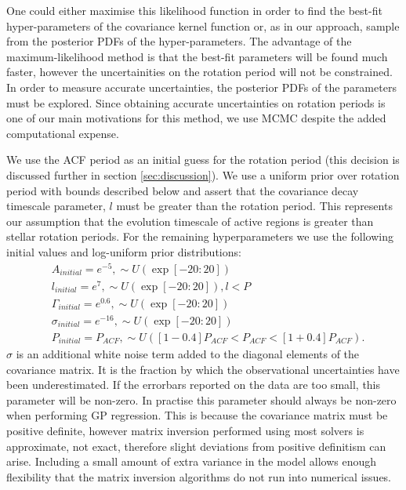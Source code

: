 One could either maximise this likelihood function in order to find the
best-fit hyper-parameters of the covariance kernel function or, as in our
approach, sample from the posterior PDFs of the hyper-parameters.
The advantage of the maximum-likelihood method is that the best-fit parameters
will be found much faster, however the uncertainities on the rotation period
will not be constrained.
In order to measure accurate uncertainties, the posterior PDFs of the
parameters must be explored.
Since obtaining accurate uncertainties on rotation periods is one of our main
motivations for this method, we use MCMC despite the added computational
expense.

We use the ACF period as an initial guess for the rotation period (this
decision is discussed further in section \textsection \ref{sec:discussion}).
We use a uniform prior over rotation period with bounds described below and
assert that the covariance decay timescale parameter, $l$ must be greater than
the rotation period.
This represents our assumption that the evolution timescale of active regions
is greater than stellar rotation periods.
For the remaining hyperparameters we use the following initial values and
log-uniform prior distributions:
\begin{eqnarray}
 	&	A_{initial} = e^{-5}, \sim U(\exp[-20:20]) \\ \nonumber
 	&	l_{initial} = e^{7}, \sim U(\exp[-20:20]), l<P \\ \nonumber
 	&	\Gamma_{initial} = e^{0.6}, \sim U(\exp[-20:20]) \\ \nonumber
 	&	\sigma_{initial} = e^{-16}, \sim U(\exp[-20:20]) \\ \nonumber
 	&	P_{initial} = P_{ACF}, \sim U([1 - 0.4]P_{ACF}<P_{ACF}<[1 +
0.4]P_{ACF}).
 \end{eqnarray}
 \label{eq:initialisation}
$\sigma$ is an additional white noise term added to the diagonal elements of
the covariance matrix. It is the fraction by which the observational
uncertainties have been underestimated.
If the errorbars reported on the data are too small, this parameter will be
non-zero.
In practise this parameter should always be non-zero when performing GP
regression.
This is because the covariance matrix must be positive definite, however
matrix inversion performed using most solvers is approximate, not exact,
therefore slight deviations from positive definitism can arise.
Including a small amount of extra variance in the model allows enough
flexibility that the matrix inversion algorithms do not run into numerical
issues.

